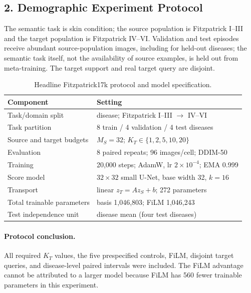 \documentclass{article}
\newcommand{\KT}{K_T}
\newcommand{\MS}{M_S}
\begin{document}
\subsection{2. Demographic Experiment Protocol}

The semantic task is skin condition; the source population is Fitzpatrick I--III and the target population is Fitzpatrick IV--VI. Validation and test episodes receive abundant source-population images, including for held-out diseases; the semantic task itself, not the availability of source examples, is held out from meta-training. The target support and real target query are disjoint.

\begin{table}[h]
\caption{Headline Fitzpatrick17k protocol and model specification.}
\label{tab:fitz-protocol}
\centering
\small
\begin{tabular}{ll}
\toprule
Component & Setting \\
\midrule
Task/domain split & disease; Fitzpatrick I--III $\rightarrow$ IV--VI \\
Task partition & 8 train / 4 validation / 4 test diseases \\
Source and target budgets & $\MS=32$; $\KT\in\{1,2,5,10,20\}$ \\
Evaluation & 8 paired repeats; 96 images/cell; DDIM-50 \\
Training & 20,000 steps; AdamW, lr $2\times10^{-4}$; EMA 0.999 \\
Score model & $32\times32$ small U-Net, base width 32, $k=16$ \\
Transport & linear $z_T=Az_S+b$; 272 parameters \\
Total trainable parameters & basis 1,046,803; FiLM 1,046,243 \\
Test independence unit & disease mean (four test diseases) \\
\bottomrule
\end{tabular}
\end{table}

\paragraph{Protocol conclusion.}
All required $\KT$ values, the five prespecified controls, FiLM, disjoint target queries, and disease-level paired intervals were included. The FiLM advantage cannot be attributed to a larger model because FiLM has 560 fewer trainable parameters in this experiment.
\end{document}
